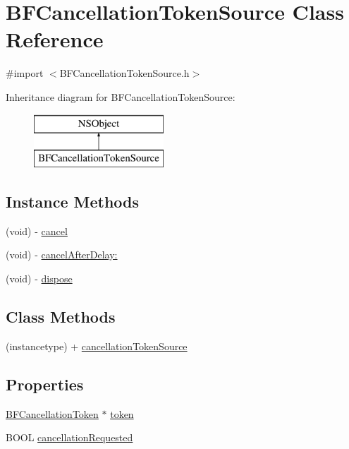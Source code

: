 \hypertarget{interface_b_f_cancellation_token_source}{}\section{B\+F\+Cancellation\+Token\+Source Class Reference}
\label{interface_b_f_cancellation_token_source}


{\ttfamily \#import $<$B\+F\+Cancellation\+Token\+Source.\+h$>$}

Inheritance diagram for B\+F\+Cancellation\+Token\+Source\+:\begin{figure}[H]
\begin{center}
\leavevmode
\includegraphics[height=2.000000cm]{interface_b_f_cancellation_token_source}
\end{center}
\end{figure}
\subsection*{Instance Methods}
\begin{DoxyCompactItemize}
\item 
(void) -\/ \hyperlink{interface_b_f_cancellation_token_source_afe09a2d3bc4a38d68dc64f0be137b2a3}{cancel}
\item 
(void) -\/ \hyperlink{interface_b_f_cancellation_token_source_a348edca9126992114d0ea49a2d103a8d}{cancel\+After\+Delay\+:}
\item 
(void) -\/ \hyperlink{interface_b_f_cancellation_token_source_ae5d7966c4905d977c078ebf04f066f38}{dispose}
\end{DoxyCompactItemize}
\subsection*{Class Methods}
\begin{DoxyCompactItemize}
\item 
(instancetype) + \hyperlink{interface_b_f_cancellation_token_source_ae0f8b9936121cfe2a5da3e5af4626f40}{cancellation\+Token\+Source}
\end{DoxyCompactItemize}
\subsection*{Properties}
\begin{DoxyCompactItemize}
\item 
\hyperlink{interface_b_f_cancellation_token}{B\+F\+Cancellation\+Token} $\ast$ \hyperlink{interface_b_f_cancellation_token_source_a17a7f0b94735efcab2dd4985060f4cb7}{token}
\item 
B\+O\+O\+L \hyperlink{interface_b_f_cancellation_token_source_a4e692d28c80e58a2e5e45a77e97461f5}{cancellation\+Requested}
\end{DoxyCompactItemize}


